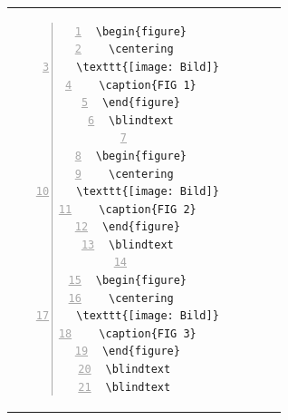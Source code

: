 \begin{table}[h!]
\begin{tabular}{c | c}
\begin{minipage}[m]{0.55\textwidth}
\begin{lstlisting}[numberstyle=\zebra{red!15}{green!15},numbers=left,basicstyle=\ttfamily\scriptsize]
\begin{figure}
  \centering  
  \texttt{[image: Bild]}
  \caption{FIG 1}
\end{figure}
\blindtext

\begin{figure}
  \centering  
  \texttt{[image: Bild]}
  \caption{FIG 2}
\end{figure}
\blindtext

\begin{figure}
  \centering  
  \texttt{[image: Bild]}
  \caption{FIG 3}
\end{figure}
\blindtext 
\blindtext 

\end{lstlisting}
\end{minipage}
\end{tabular}
\end{table}
